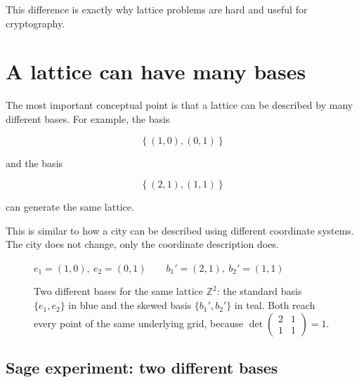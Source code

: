 This difference is exactly why lattice problems are hard and useful for cryptography.

\section{A lattice can have many bases}
The most important conceptual point is that a lattice can be described by many different bases. For example, the basis

\[
\left\{(1,0), (0,1)\right\}
\]

and the basis

\[
\left\{(2,1), (1,1)\right\}
\]

can generate the same lattice.

This is similar to how a city can be described using different coordinate systems. The city does not change, only the coordinate description does.

\begin{figure}[H]
\centering
{}

{\small\centering $e_1=(1,0),\ e_2=(0,1) \qquad b_1'=(2,1),\ b_2'=(1,1)$\par}
\vspace{2pt}
\caption{Two different bases for the same lattice $\mathbb{Z}^2$: the standard basis $\{e_1,e_2\}$ in blue and the skewed basis $\{b_1',b_2'\}$ in teal. Both reach every point of the same underlying grid, because $\det\left(\begin{smallmatrix}2&1\\1&1\end{smallmatrix}\right)=1$.}
\label{fig:lattice-two-bases}
\end{figure}

\subsection{Sage experiment: two different bases}

